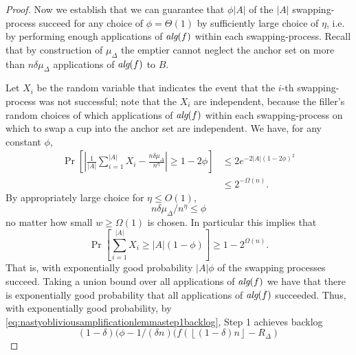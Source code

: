 \documentclass[twocolumn]{article}[10pt]
\newcommand{\alg}[1]{\textit{\text{alg}}({#1})}
\newcommand{\floor}[1]{\left\lfloor #1 \right\rfloor}
\begin{document}
\begin{proof}

  Now we establish that we can guarantee that $\phi |A|$ of the
  $|A|$ swapping-process succeed for any choice of $\phi =
  \Theta(1)$ by sufficiently large choice of $\eta$, i.e. by performing
  enough applications of $\alg{f}$ within each swapping-process.
  Recall that by construction of $\mu_\Delta$ the emptier cannot
  neglect the anchor set on more than $n\delta \mu_\Delta$
  applications of $\alg{f}$ to $B$. 

  Let $X_i$ be the random variable that indicates the event that
  the $i$-th swapping-process was not successful; note that the
  $X_i$ are independent, because the filler's random choices of
  which applications of $\alg{f}$ within each swapping-process on
  which to swap a cup into the anchor set are independent.
  We have, for any constant $\phi$,
  \begin{align*}
  \Pr\left[\left|\frac{1}{|A|}\sum_{i=1}^{|A|}X_i - \frac{n\delta\mu_\Delta}{n^{\eta}}\right| \ge 1-2\phi \right] 
  &\le 2e^{-2|A|(1-2\phi)^2} \\
  &\le 2^{-\Omega(n)}.
  \end{align*}
  By appropriately large choice for $\eta \le O(1)$, $$n\delta\mu_\Delta / n^\eta
  \le \phi$$ no matter how small $w \ge \Omega(1)$ is chosen. In particular this
  implies that $$\Pr\left[\sum_{i=1}^{|A|} X_i \ge |A|(1-\phi)\right] \ge 1-2^{\Omega(n)}.$$
  That is, with exponentially good probability $|A|\phi$ of the swapping processes succeed.
  Taking a union bound over all applications of $\alg{f}$ we have
  that there is exponentially good probability that all
  applications of $\alg{f}$ succeeded. Thus, with exponentially
  good probability, by \eqref{eq:nastyobliviousamplificationlemmastep1backlog}, Step 1 achieves
  backlog $$(1-\delta)(\phi-1/(\delta n)(f(\floor{(1-\delta)n}-R_\Delta)$$


\end{proof}
\end{document}
